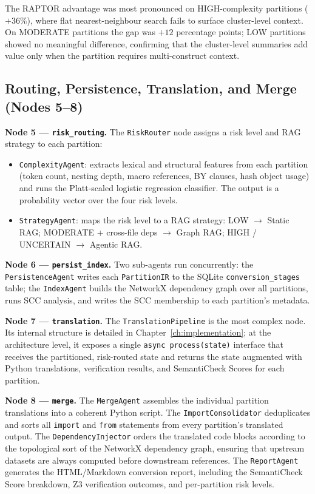 The RAPTOR advantage was most pronounced on HIGH-complexity partitions ($+36\%$),
where flat nearest-neighbour search fails to surface cluster-level context. On
MODERATE partitions the gap was $+12$ percentage points; LOW partitions showed
no meaningful difference, confirming that the cluster-level summaries add value
only when the partition requires multi-construct context.

\subsection{Routing, Persistence, Translation, and Merge (Nodes 5--8)}
\label{subsec:nodes-routing-merge}

\textbf{Node 5 --- \texttt{risk\_routing}.} The \texttt{RiskRouter} node
assigns a risk level and RAG strategy to each partition:

\begin{itemize}
  \item \texttt{ComplexityAgent}: extracts lexical and structural features from
    each partition (token count, nesting depth, macro references, BY clauses,
    hash object usage) and runs the Platt-scaled logistic regression classifier.
    The output is a probability vector over the four risk levels.
  \item \texttt{StrategyAgent}: maps the risk level to a RAG strategy:
    LOW $\rightarrow$ Static RAG; MODERATE + cross-file deps $\rightarrow$
    Graph RAG; HIGH / UNCERTAIN $\rightarrow$ Agentic RAG.
\end{itemize}

\textbf{Node 6 --- \texttt{persist\_index}.} Two sub-agents run concurrently:
the \texttt{PersistenceAgent} writes each \texttt{PartitionIR} to the SQLite
\texttt{conversion\_stages} table; the \texttt{IndexAgent} builds the NetworkX
dependency graph over all partitions, runs SCC analysis, and writes the
SCC membership to each partition's metadata.

\textbf{Node 7 --- \texttt{translation}.} The \texttt{TranslationPipeline}
is the most complex node. Its internal structure is detailed in
Chapter~\ref{ch:implementation}; at the architecture level, it exposes a single
\texttt{async process(state)} interface that receives the partitioned,
risk-routed state and returns the state augmented with Python translations,
verification results, and SemantiCheck Scores for each partition.

\textbf{Node 8 --- \texttt{merge}.} The \texttt{MergeAgent} assembles the
individual partition translations into a coherent Python script. The
\texttt{ImportConsolidator} deduplicates and sorts all \texttt{import} and
\texttt{from} statements from every partition's translated output. The
\texttt{DependencyInjector} orders the translated code blocks according to the
topological sort of the NetworkX dependency graph, ensuring that upstream
datasets are always computed before downstream references. The
\texttt{ReportAgent} generates the HTML/Markdown conversion report, including
the SemantiCheck Score breakdown, Z3 verification outcomes, and per-partition
risk levels.

